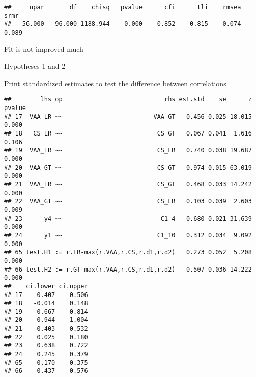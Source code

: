 \documentclass[
]{article}
\newenvironment{Shaded}{\begin{snugshade}}{\end{snugshade}}
\newcommand{\KeywordTok}[1]{\textcolor[rgb]{0.13,0.29,0.53}{\textbf{#1}}}
\newcommand{\NormalTok}[1]{#1}
\newcommand{\OperatorTok}[1]{\textcolor[rgb]{0.81,0.36,0.00}{\textbf{#1}}}
\newcommand{\StringTok}[1]{\textcolor[rgb]{0.31,0.60,0.02}{#1}}
\begin{document}
\begin{verbatim}
##     npar       df    chisq   pvalue      cfi      tli    rmsea     srmr 
##   56.000   96.000 1188.944    0.000    0.852    0.815    0.074    0.089
\end{verbatim}

Fit is not improved much

Hypotheses 1 and 2

Print standardized estimates to test the difference between correlations

\begin{Shaded}
\end{Shaded}

\begin{verbatim}
##        lhs op                            rhs est.std    se      z pvalue
## 17  VAA_LR ~~                         VAA_GT   0.456 0.025 18.015  0.000
## 18   CS_LR ~~                          CS_GT   0.067 0.041  1.616  0.106
## 19  VAA_LR ~~                          CS_LR   0.740 0.038 19.687  0.000
## 20  VAA_GT ~~                          CS_GT   0.974 0.015 63.019  0.000
## 21  VAA_LR ~~                          CS_GT   0.468 0.033 14.242  0.000
## 22  VAA_GT ~~                          CS_LR   0.103 0.039  2.603  0.009
## 23      y4 ~~                           C1_4   0.680 0.021 31.639  0.000
## 24      y1 ~~                          C1_10   0.312 0.034  9.092  0.000
## 65 test.H1 := r.LR-max(r.VAA,r.CS,r.d1,r.d2)   0.273 0.052  5.208  0.000
## 66 test.H2 := r.GT-max(r.VAA,r.CS,r.d1,r.d2)   0.507 0.036 14.222  0.000
##    ci.lower ci.upper
## 17    0.407    0.506
## 18   -0.014    0.148
## 19    0.667    0.814
## 20    0.944    1.004
## 21    0.403    0.532
## 22    0.025    0.180
## 23    0.638    0.722
## 24    0.245    0.379
## 65    0.170    0.375
## 66    0.437    0.576
\end{verbatim}
\end{document}
